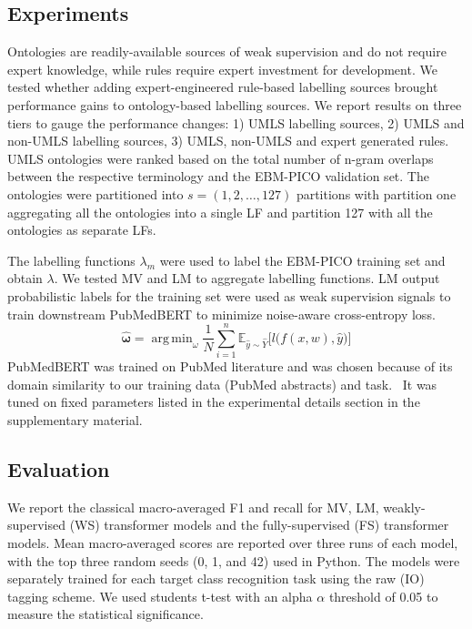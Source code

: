 \documentclass[10.7pt,]{article}
\DeclareMathOperator*{\argmin}{arg\,min}
\begin{document}
\subsection{Experiments}\label{subsec:experiments}
%
Ontologies are readily-available sources of weak supervision and do not require expert knowledge, while rules require expert investment for development.
We tested whether adding expert-engineered rule-based labelling sources brought performance gains to ontology-based labelling sources.
We report results on three tiers to gauge the performance changes: 1) UMLS labelling sources, 2) UMLS and non-UMLS labelling sources, 3) UMLS, non-UMLS and expert generated rules. 
UMLS ontologies were ranked based on the total number of n-gram overlaps between the respective terminology and the EBM-PICO validation set.
The ontologies were partitioned into $s = ( 1, 2, \dotso , 127 )$ partitions with partition one aggregating all the ontologies into a single LF and partition 127 with all the ontologies as separate LFs.


The labelling functions $\lambda_{m}$ were used to label the EBM-PICO training set and obtain $\lambda$. 
We tested MV and LM to aggregate labelling functions.
LM output probabilistic labels for the training set were used as weak supervision signals to train downstream PubMedBERT to minimize noise-aware cross-entropy loss.
%
\begin{equation}
\bm{\hat{\omega}} = \argmin_{\omega} \frac{1}{N} \sum_{i=1}^{n} \mathbb{ E }_{ \hat{y} \sim \hat{Y}} \big[ l \big( f(x, w), \hat{y} \big) \big]
\end{equation}
%
PubMedBERT was trained on PubMed literature and was chosen because of its domain similarity to our training data (PubMed abstracts) and task.~\cite{gu2021domain}
It was tuned on fixed parameters listed in the experimental details section in the supplementary material. 
%
%
%
\subsection{Evaluation}\label{eval}
%
We report the classical macro-averaged F1 and recall for MV, LM, weakly-supervised (WS) transformer models and the fully-supervised (FS) transformer models.
Mean macro-averaged scores are reported over three runs of each model, with the top three random seeds (0, 1, and 42) used in Python.
The models were separately trained for each target class recognition task using the raw (IO) tagging scheme.
We used students t-test with an alpha $\alpha$ threshold of 0.05 to measure the statistical significance.
%
\end{document}
